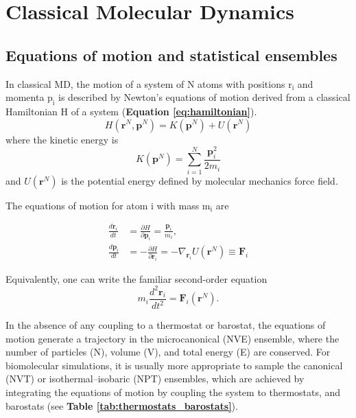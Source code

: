 \documentclass[12pt]{article}
\begin{document}
\section{Classical Molecular Dynamics}

\subsection{Equations of motion and statistical ensembles}

In classical MD, the motion of a system of N atoms with positions $\textrm{r}_\textrm{i}$ and momenta $\textrm{p}_\textrm{i}$ is described by Newton's equations of motion derived from a classical Hamiltonian H of a system (\textbf{Equation \ref{eq:hamiltonian}}).
\begin{equation}
H(\mathbf{r}^N,\mathbf{p}^N) = K(\mathbf{p}^N) + U(\mathbf{r}^N)
\label{eq:hamiltonian}
\end{equation}
where the kinetic energy is
\begin{equation}
K(\mathbf{p}^N) = \sum_{i=1}^{N} \frac{\mathbf{p}_i^2}{2m_i}
\label{eq:hamilKinetics}
\end{equation}
and $U(\mathbf{r}^N)$ is the potential energy defined by molecular mechanics force field\cite{CH9_FrenkelSmit2023,CH9_AllenTildesley2017}.      

The equations of motion for atom i with mass $\textrm{m}_\textrm{i}$ are

\begin{align}
\frac{d\mathbf{r}_i}{dt} &= \frac{\partial H}{\partial \mathbf{p}_i} = \frac{\mathbf{p}_i}{m_i}, \\
\frac{d\mathbf{p}_i}{dt} &= -\frac{\partial H}{\partial \mathbf{r}_i} = -\nabla_{\mathbf{r}_i} U(\mathbf{r}^N) \equiv \mathbf{F}_i
\label{eq:equaofmotion}
\end{align}

Equivalently, one can write the familiar second-order equation
\begin{equation}
m_i \frac{d^2 \mathbf{r}_i}{dt^2} = \mathbf{F}_i(\mathbf{r}^N).
\end{equation}

In the absence of any coupling to a thermostat or barostat, the equations of motion generate a trajectory in the microcanonical (NVE) ensemble, where the number of particles (N), volume (V), and total energy (E) are conserved. For biomolecular simulations, it is usually more appropriate to sample the canonical (NVT) or isothermal--isobaric (NPT) ensembles, which are achieved by integrating the equations of motion by coupling the system to thermostats, and barostats (see \textbf{Table \ref{tab:thermostats_barostats}})\cite{CH9_Martyna1992, CH9_ParrinelloRahman1981,CH9_bussi2007canonical}.
\end{document}

